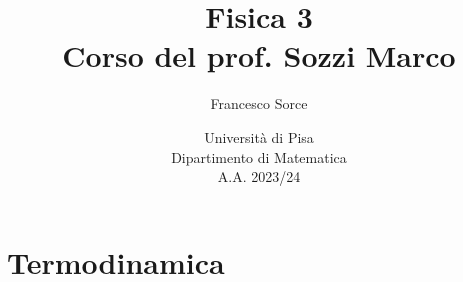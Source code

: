 \documentclass[a4paper]{report}
\title{Fisica 3\\
\large Corso del prof. Sozzi Marco}
\author{Francesco Sorce}
\date{Università di Pisa\\
Dipartimento di Matematica\\
A.A. 2023/24}
\begin{document}
\maketitle

\tableofcontents
\newpage


\part{Termodinamica}
















\appendix


%
\end{document}
